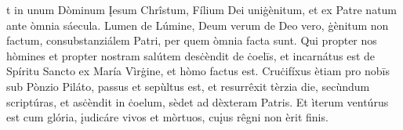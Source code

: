 t in unum Dòminum Įesum Chrîstum, Fílium Dei uniġènitum, et ex Patre natum ante òmnia sáecula. Lumen de Lúmine, Deum verum de Deo vero, ġènitum non factum, consubstanziálem Patri, per quem òmnia facta sunt. Qui propter nos hòmines et propter nostram salútem desċèndit de ċoelīs, et incarnátus est de Spíritu Sancto ex María Vìrġine, et hòmo factus est. Cruċifíxus ètiam pro nobīs sub Pònzio Piláto, passus et sepùltus est, et resurrêxit tèrzia die, secùndum scriptúras, et asċèndit in ċoelum, sèdet ad dèxteram Patris. Et ìterum ventúrus est cum glória, įudicáre vivos et mòrtuos, cuįus rêgni non èrit finis.
